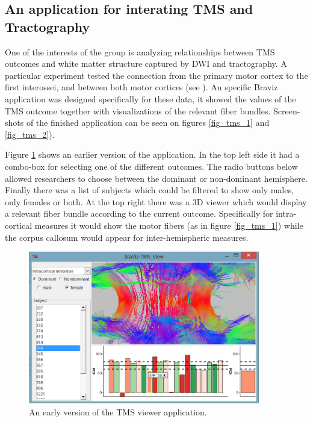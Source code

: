 \subsection{An application for interating TMS and Tractography}

One of the interests of the group is analyzing relationships between TMS outcomes and white matter structure captured by DWI and tractography. A particular experiment tested the connection from the primary motor cortex to the first interossei, and between both motor cortices (see \autocite{schneider_cerebral_2012}). An specific Braviz application was designed specifically for these data, it showed the values of the TMS outcome together with visualizations of the relevant fiber bundles. Screen-shots of the finished application can be seen on figures \ref{fig_tms_1} and \ref{fig_tms_2}). 

Figure \ref{fig_tms_view_early} shows an earlier version of the application. In the top left side it had a combo-box for selecting one of the different outcomes. The radio buttons below allowed researchers to choose between the dominant or non-dominant hemisphere. Finally there was a list of subjects which could be filtered to show only males, only females or both. At the top right there was a 3D viewer which would display a relevant fiber bundle according to the current outcome. Specifically for intra-cortical measures it would show the motor fibers (as in figure \ref{fig_tms_1}) while the corpus callosum would appear for inter-hemispheric measures.

\begin{figure}
	\centering
		\includegraphics[width=0.90\textwidth]{figures/analysis/tms_view_early}
	\caption{An early version of the TMS viewer application.}
	\label{fig_tms_view_early}
\end{figure}

